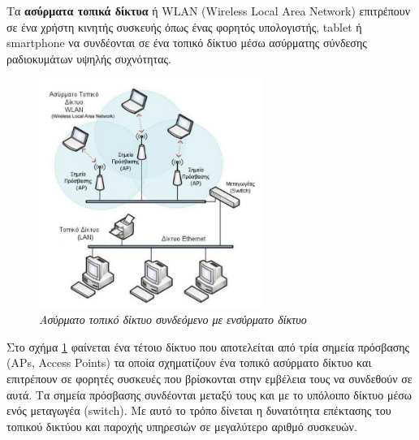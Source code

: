 Τα \textbf{ασύρματα τοπικά δίκτυα} ή WLAN (Wireless Local Area Network) επιτρέπουν σε ένα χρήστη κινητής συσκευής όπως ένας φορητός υπολογιστής, tablet ή smartphone να συνδέονται σε ένα τοπικό δίκτυο μέσω ασύρματης σύνδεσης ραδιοκυμάτων υψηλής συχνότητας.

\begin{figure}[!ht]
  \centering
  \includegraphics[width=0.65\textwidth]{images/chapter2/2-7}
  \caption {\textsl{Ασύρματο τοπικό δίκτυο συνδεόμενο με ενσύρματο δίκτυο}}
  \label{2-7}
\end{figure}

Στο σχήμα \ref{2-7} φαίνεται ένα τέτοιο δίκτυο που αποτελείται από τρία σημεία πρόσβασης (APs, Access Points) τα οποία σχηματίζουν ένα τοπικό ασύρματο δίκτυο και επιτρέπουν σε φορητές συσκευές που βρίσκονται στην εμβέλεια τους να συνδεθούν σε αυτά. Τα σημεία πρόσβασης συνδέονται μεταξύ τους και με το υπόλοιπο δίκτυο μέσω ενός μεταγωγέα (switch). Με αυτό το τρόπο δίνεται η δυνατότητα επέκτασης του τοπικού δικτύου και παροχής υπηρεσιών σε μεγαλύτερο αριθμό συσκευών. 